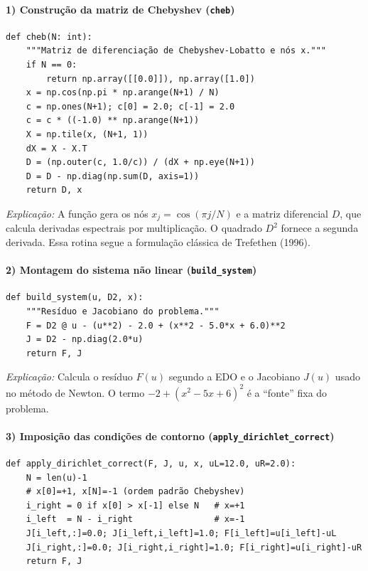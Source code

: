 \documentclass[12pt,a4paper]{article}
\begin{document}
\paragraph{1) Construção da matriz de Chebyshev (\texttt{cheb})}
\begin{verbatim}
def cheb(N: int):
    """Matriz de diferenciação de Chebyshev-Lobatto e nós x."""
    if N == 0:
        return np.array([[0.0]]), np.array([1.0])
    x = np.cos(np.pi * np.arange(N+1) / N)
    c = np.ones(N+1); c[0] = 2.0; c[-1] = 2.0
    c = c * ((-1.0) ** np.arange(N+1))
    X = np.tile(x, (N+1, 1))
    dX = X - X.T
    D = (np.outer(c, 1.0/c)) / (dX + np.eye(N+1))
    D = D - np.diag(np.sum(D, axis=1))
    return D, x
\end{verbatim}

\noindent
\textit{Explicação:}  
A função gera os nós \(x_j=\cos(\pi j/N)\) e a matriz diferencial \(D\), que calcula derivadas espectrais por multiplicação.  
O quadrado \(D^2\) fornece a segunda derivada.  
Essa rotina segue a formulação clássica de Trefethen (1996).

\paragraph{2) Montagem do sistema não linear (\texttt{build\_system})}
\begin{verbatim}
def build_system(u, D2, x):
    """Resíduo e Jacobiano do problema."""
    F = D2 @ u - (u**2) - 2.0 + (x**2 - 5.0*x + 6.0)**2
    J = D2 - np.diag(2.0*u)
    return F, J
\end{verbatim}

\noindent
\textit{Explicação:}  
Calcula o resíduo \(F(u)\) segundo a EDO e o Jacobiano \(J(u)\) usado no método de Newton.  
O termo \(-2+(x^2-5x+6)^2\) é a “fonte” fixa do problema.

\paragraph{3) Imposição das condições de contorno (\texttt{apply\_dirichlet\_correct})}
\begin{verbatim}
def apply_dirichlet_correct(F, J, u, x, uL=12.0, uR=2.0):
    N = len(u)-1
    # x[0]=+1, x[N]=-1 (ordem padrão Chebyshev)
    i_right = 0 if x[0] > x[-1] else N   # x=+1
    i_left  = N - i_right                # x=-1
    J[i_left,:]=0.0; J[i_left,i_left]=1.0; F[i_left]=u[i_left]-uL
    J[i_right,:]=0.0; J[i_right,i_right]=1.0; F[i_right]=u[i_right]-uR
    return F, J
\end{verbatim}
\end{document}
